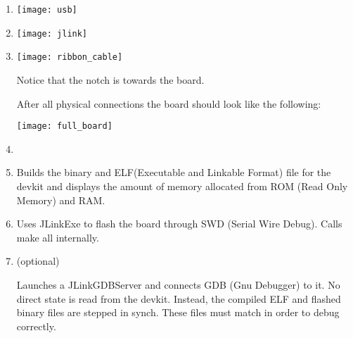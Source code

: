 \documentclass[12pt, a4paper]{article}
\begin{document}
\begin{enumerate}

    \item {}

        \begin{centering}
        \texttt{[image: usb]}
        \end{centering}

    \item {}

        \begin{centering}
        \texttt{[image: jlink]}
        \end{centering}

    \item {}

        \begin{centering}
        \texttt{[image: ribbon\_cable]}
        \end{centering}

        Notice that the notch is towards the board.

        \noindent
        After all physical connections the board should look like the following:

        \begin{centering}
        \texttt{[image: full\_board]}
        \end{centering}

    \newpage
    \item {}
    \item {}

        \medskip
        \noindent
        Builds the binary and ELF(Executable and Linkable Format) file for the devkit and displays the amount of memory allocated from ROM (Read Only Memory) and RAM.
        
    \item {}

        \medskip
        \noindent
        Uses JLinkExe to flash the board through SWD (Serial Wire Debug). 
        Calls make all internally.

    \item (optional) 

        \medskip
        \noindent
        Launches a JLinkGDBServer and connects GDB (Gnu Debugger) to it. 
        No direct state is read from the devkit. 
        Instead, the compiled ELF and flashed binary files are stepped in synch. 
        These files must match in order to debug correctly. 
\end{enumerate}
\end{document}
